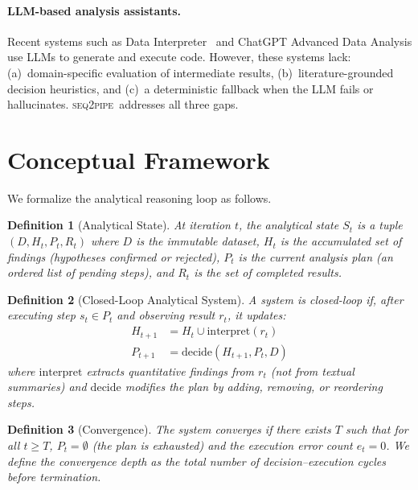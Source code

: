 \documentclass[11pt,a4paper]{article}
\newtheorem{definition}{Definition}
\newcommand{\seqpipe}{\textsc{seq2pipe}}
\begin{document}
\paragraph{LLM-based analysis assistants.}
Recent systems such as Data Interpreter~\citep{hong2024data} and
ChatGPT Advanced Data Analysis use LLMs to generate and execute code.
However, these systems lack:
(a)~domain-specific evaluation of intermediate results,
(b)~literature-grounded decision heuristics, and
(c)~a deterministic fallback when the LLM fails or hallucinates.
\seqpipe\ addresses all three gaps.

\section{Conceptual Framework}
\label{sec:concept}

We formalize the analytical reasoning loop as follows.

\begin{definition}[Analytical State]
At iteration $t$, the analytical state $S_t$ is a tuple
$(D, H_t, P_t, R_t)$ where $D$ is the immutable dataset,
$H_t$ is the accumulated set of findings (hypotheses confirmed or
rejected), $P_t$ is the current analysis plan (an ordered list of
pending steps), and $R_t$ is the set of completed results.
\end{definition}

\begin{definition}[Closed-Loop Analytical System]
A system is \emph{closed-loop} if, after executing step $s_t \in P_t$
and observing result $r_t$, it updates:
\begin{align}
  H_{t+1} &= H_t \cup \mathrm{interpret}(r_t) \\
  P_{t+1} &= \mathrm{decide}(H_{t+1}, P_t, D)
\end{align}
where $\mathrm{interpret}$ extracts quantitative findings from $r_t$
(not from textual summaries) and $\mathrm{decide}$ modifies the plan
by adding, removing, or reordering steps.
\end{definition}

\begin{definition}[Convergence]
The system \emph{converges} if there exists $T$ such that for all
$t \geq T$, $P_t = \emptyset$ (the plan is exhausted) and the
execution error count $e_t = 0$.
We define the \emph{convergence depth} as the total number of
decision--execution cycles before termination.
\end{definition}
\end{document}
